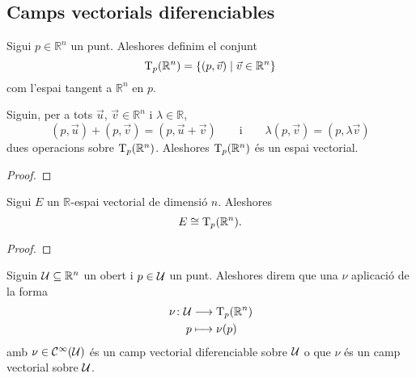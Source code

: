\documentclass[../Apunts.tex]{subfiles}
\begin{document}
	\subsection{Camps vectorials diferenciables}
	\begin{definition}
		\label{def:espai tangent a Rn}
		Sigui \(p\in\mathbb{R}^{n}\) un punt. Aleshores definim el conjunt
		\begin{equation*}
			\operatorname{T}_{p}(\mathbb{R}^{n})=\{(p,\vec{v})\mid\vec{v}\in\mathbb{R}^{n}\}
		\end{equation*}
		com l'espai tangent a \(\mathbb{R}^{n}\) en \(p\).
	\end{definition}
	\begin{proposition}
		\label{prop:l'espai tangent a Rn és un espai vectorial}
		Siguin, per a tots \(\vec{u}\), \(\vec{v}\in\mathbb{R}^{n}\) i \(\lambda\in\mathbb{R}\),
		\begin{equation*}
			(p,\vec{u})+(p,\vec{v})=(p,\vec{u}+\vec{v})
			\qquad\text{i}\qquad
			\lambda(p,\vec{v})=(p,\lambda\vec{v})
		\end{equation*}
		dues operacions sobre \(\operatorname{T}_{p}(\mathbb{R}^{n})\). Aleshores \(\operatorname{T}_{p}(\mathbb{R}^{n})\) és un espai vectorial.
	\end{proposition}
	\begin{proof}
	\end{proof}
	\begin{observation}
		\label{prop:l'espai tangent a Rn és isomorf a un R-espai vectorial de dimensió n}
		Sigui \(E\) un \(\mathbb{R}\)-espai vectorial de dimensió \(n\). Aleshores
		\begin{equation*}
			E\cong\operatorname{T}_{p}(\mathbb{R}^{n}).
		\end{equation*}
	\end{observation}
	\begin{proof}
	\end{proof}
	\begin{definition}
		\label{def:camp vectorial diferenciable}
		Siguin \(\mathcal{U}\subseteq\mathbb{R}^{n}\) un obert i \(p\in\mathcal{U}\) un punt. Aleshores direm que una \(\nu\) aplicació de la forma
		\begin{align*}
			\nu\colon\mathcal{U}&\longrightarrow\operatorname{T}_{p}(\mathbb{R}^{n}) \\
			p&\longmapsto\nu(p)
		\end{align*}
		amb \(\nu\in\mathcal{C}^{\infty}(\mathcal{U})\) és un camp vectorial diferenciable sobre \(\mathcal{U}\) o que \(\nu\) és un camp vectorial sobre \(\mathcal{U}\).
	\end{definition}
\end{document}
